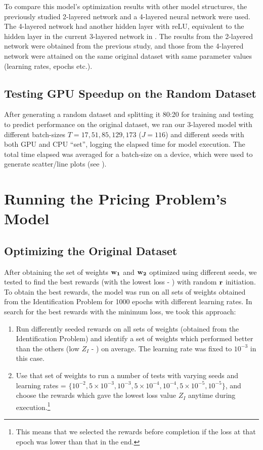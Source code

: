 To compare this model's optimization results with other model structures, the previously studied 2-layered network \cite{Xue2016Avi2} and a 4-layered neural network were used. The 4-layered network had another hidden layer with reLU, equivalent to the hidden layer in the current 3-layered network in . The results from the 2-layered network were obtained from the previous study, and those from the 4-layered network were attained on the same original dataset with same parameter values (learning rates, epochs etc.).

\subsection{Testing GPU Speedup on the Random Dataset} \label{sec:Identification Problem-Testing GPU Speedup on the Random Dataset}
After generating a random dataset and splitting it 80:20 for training and testing to predict performance on the original dataset, we ran our 3-layered model with different batch-sizes $T = 17, 51, 85, 129, 173$ ($J = 116$) and different seeds with both GPU and CPU ``set'', logging the elapsed time for model execution. The total time elapsed was averaged for a batch-size on a device, which were used to generate scatter/line plots (see ).

\section{Running the Pricing Problem's Model} \label{sec:Running the Pricing Problem's Model}
\subsection{Optimizing the Original Dataset} \label{sec:Pricing Problem-Optimizing the Original Dataset}
After obtaining the set of weights $\mathbf{w_1}$ and $\mathbf{w_2}$ optimized using different seeds, we tested to find the best rewards (with the lowest loss - ) with random $\mathbf{r}$ initiation. To obtain the best rewards, the model was run on all sets of weights obtained from the Identification Problem for 1000 epochs with different learning rates. In search for the best rewards with the minimum loss, we took this approach:
\begin{enumerate}
    \item Run differently seeded rewards on all sets of weights (obtained from the Identification Problem) and identify a set of weights which performed better than the others (low $Z_I$ - ) on average. The learning rate was fixed to $10^{-3}$ in this case.
    \item Use that set of weights to run a number of tests with varying seeds and learning rates = $\{10^{-2}, 5 \times 10^{-3}, 10^{-3}, 5 \times 10^{-4}, 10^{-4}, 5 \times 10^{-5}, 10^{-5}\}$, and choose the rewards which gave the lowest loss value $Z_I$ anytime during execution.\footnote{This means that we selected the rewards before completion if the loss at that epoch was lower than that in the end.} 
\end{enumerate}

